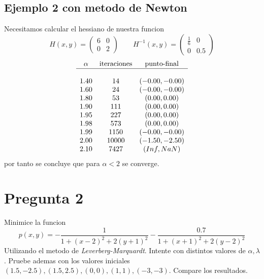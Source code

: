\documentclass[letterpaper]{article}
\begin{document}
\subsection*{Ejemplo 2 con metodo de Newton}
\noindent Necesitamos calcular el hessiano de nuestra funcion
\[ H(x,y) =
  \begin{pmatrix}
    6 & 0 \\
    0 & 2
  \end{pmatrix}
  \qquad
  H^{-1}(x,y) =
  \begin{pmatrix}
    \frac{1}{6} & 0 \\
    0 & 0.5
  \end{pmatrix}
\]
\[
\begin{array}{c c c}
  \alpha & \text{iteraciones} & \text{punto-final} \\
  \hline \\
  1.40 & 14    & (-0.00, -0.00) \\
  1.60 & 24    & (-0.00, -0.00) \\
  1.80 & 53    & (0.00, 0.00)   \\
  1.90 & 111   & (0.00, 0.00)   \\
  1.95 & 227   & (0.00, 0.00)   \\
  1.98 & 573   & (0.00, 0.00)   \\
  1.99 & 1150  & (-0.00, -0.00) \\
  2.00 & 10000 & (-1.50, -2.50) \\
  2.10 & 7427  & (Inf, NaN)     \\
\end{array}
\]
por tanto se concluye que para \(\alpha < 2\) se converge.

\section*{Pregunta 2}
\noindent Minimice la funcion
\[ p(x,y) = - \frac{1}{1 + (x-2)^2 + 2 (y+1)^2} - \frac{0.7}{1 + (x+1)^2 +
    2 (y - 2)^2 } \]
Utilizando el metodo de \emph{Leverberg-Marquardt}. Intente con distintos
valores de \(\alpha, \lambda\). Pruebe ademas con los valores iniciales
\((1.5, -2.5), (1.5, 2.5), (0,0), (1,1), (-3,-3)\). Compare los resultados.
\newline
\end{document}
